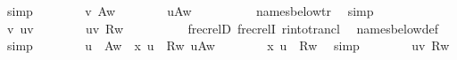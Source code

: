 \begin{isabellebody}
\ simp\isanewline
\ \ \ \ \ \ \isamarkupfalse%
\ {\isacartoucheopen}v\ {\isasymin}{\isacharquery}{\kern0pt}A{\isacharparenleft}{\kern0pt}w{\isacharparenright}{\kern0pt}{\isacartoucheclose}\isanewline
\ \ \ \ \ \ \isamarkupfalse%
\ {\isachardoublequoteopen}u{\isasymin}{\isacharquery}{\kern0pt}A{\isacharparenleft}{\kern0pt}w{\isacharparenright}{\kern0pt}{\isachardoublequoteclose}\isanewline
\ \ \ \ \ \ \ \ \isamarkupfalse%
\ names{\isacharunderscore}{\kern0pt}below{\isacharunderscore}{\kern0pt}tr\ \isamarkupfalse%
\ simp\isanewline
\ \ \ \ \ \ \isamarkupfalse%
\ {\isacartoucheopen}v{\isasymin}{\isacharunderscore}{\kern0pt}{\isacartoucheclose}\ {\isacartoucheopen}{\isasymlangle}u{\isacharcomma}{\kern0pt}v{\isasymrangle}{\isasymin}{\isacharunderscore}{\kern0pt}{\isacartoucheclose}\isanewline
\ \ \ \ \ \ \isamarkupfalse%
\ {\isachardoublequoteopen}{\isasymlangle}u{\isacharcomma}{\kern0pt}v{\isasymrangle}{\isasymin}\ {\isacharquery}{\kern0pt}R{\isacharparenleft}{\kern0pt}w{\isacharparenright}{\kern0pt}{\isachardoublequoteclose}\isanewline
\ \ \ \ \ \ \ \ \isamarkupfalse%
\ frecrelD\ frecrelI\ r{\isacharunderscore}{\kern0pt}into{\isacharunderscore}{\kern0pt}trancl\ \isamarkupfalse%
\ names{\isacharunderscore}{\kern0pt}below{\isacharunderscore}{\kern0pt}def\ \isamarkupfalse%
\ simp\isanewline
\ \ \ \ \ \ \isamarkupfalse%
\ {\isacartoucheopen}u\ {\isasymin}\ {\isacharquery}{\kern0pt}A{\isacharparenleft}{\kern0pt}w{\isacharparenright}{\kern0pt}\ {\isasymLongrightarrow}\ {\isasymlangle}x{\isacharcomma}{\kern0pt}\ u{\isasymrangle}\ {\isasymin}\ {\isacharquery}{\kern0pt}R{\isacharparenleft}{\kern0pt}w{\isacharparenright}{\kern0pt}{\isacharcircum}{\kern0pt}{\isacharplus}{\kern0pt}{\isacartoucheclose}\ {\isacartoucheopen}u{\isasymin}{\isacharquery}{\kern0pt}A{\isacharparenleft}{\kern0pt}w{\isacharparenright}{\kern0pt}{\isacartoucheclose}\isanewline
\ \ \ \ \ \ \isamarkupfalse%
\ {\isachardoublequoteopen}{\isasymlangle}x{\isacharcomma}{\kern0pt}\ u{\isasymrangle}\ {\isasymin}\ {\isacharquery}{\kern0pt}R{\isacharparenleft}{\kern0pt}w{\isacharparenright}{\kern0pt}{\isacharcircum}{\kern0pt}{\isacharplus}{\kern0pt}{\isachardoublequoteclose}\ \isamarkupfalse%
\ simp\isanewline
\ \ \ \ \ \ \isamarkupfalse%
\ {\isacartoucheopen}{\isasymlangle}u{\isacharcomma}{\kern0pt}v{\isasymrangle}{\isasymin}\ {\isacharquery}{\kern0pt}R{\isacharparenleft}{\kern0pt}w{\isacharparenright}{\kern0pt}{\isacartoucheclose}\isanewline

\end{isabellebody}
